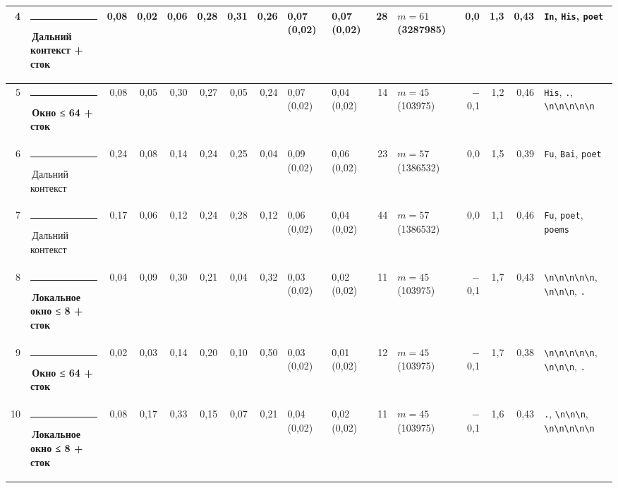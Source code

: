 \documentclass[10pt]{article}
\begin{document}
\begin{minipage}{\linewidth}
\begin{center}
{\begin{tabular}{|r|l|r|r|r|r|r|r|l|l|r|l|r|r|r|l|}
4 & \textcolor[HTML]{C3C2B7}{\rule{0.62em}{0.62em}}\,Дальний контекст + сток & 0,08 & 0,02 & 0,06 & 0,28 & 0,31 & 0,26 & 0,07 (0,02) & 0,07 (0,02) & 28 & $m{=}61$ (3287985) & 0,0 & 1,3 & 0,43 & \texttt{\textvisiblespace{}In}, \texttt{\textvisiblespace{}His}, \texttt{\textvisiblespace{}poet} \\ \hline
5 & \textcolor[HTML]{EDA100}{\rule{0.62em}{0.62em}}\,\textbf{Окно ≤ 64 + сток} & 0,08 & 0,05 & 0,30 & 0,27 & 0,05 & 0,24 & 0,07 (0,02) & 0,04 (0,02) & 14 & $m{=}45$ (103975) & $-$0,1 & 1,2 & 0,46 & \texttt{\textvisiblespace{}His}, \texttt{\textvisiblespace{}.}, \texttt{\textvisiblespace{}\textbackslash{}n\textbackslash{}n\textbackslash{}n\textbackslash{}n\textbackslash{}n} \\ \hline
6 & \textcolor[HTML]{C3C2B7}{\rule{0.62em}{0.62em}}\,Дальний контекст & 0,24 & 0,08 & 0,14 & 0,24 & 0,25 & 0,04 & 0,09 (0,02) & 0,06 (0,02) & 23 & $m{=}57$ (1386532) & 0,0 & 1,5 & 0,39 & \texttt{\textvisiblespace{}Fu}, \texttt{\textvisiblespace{}Bai}, \texttt{\textvisiblespace{}poet} \\ \hline
7 & \textcolor[HTML]{C3C2B7}{\rule{0.62em}{0.62em}}\,Дальний контекст & 0,17 & 0,06 & 0,12 & 0,24 & 0,28 & 0,12 & 0,06 (0,02) & 0,04 (0,02) & 44 & $m{=}57$ (1386532) & 0,0 & 1,1 & 0,46 & \texttt{\textvisiblespace{}Fu}, \texttt{\textvisiblespace{}poet}, \texttt{\textvisiblespace{}poems} \\ \hline
8 & \textcolor[HTML]{1BAF7A}{\rule{0.62em}{0.62em}}\,\textbf{Локальное окно ≤ 8 + сток} & 0,04 & 0,09 & 0,30 & 0,21 & 0,04 & 0,32 & 0,03 (0,02) & 0,02 (0,02) & 11 & $m{=}45$ (103975) & $-$0,1 & 1,7 & 0,43 & \texttt{\textvisiblespace{}\textbackslash{}n\textbackslash{}n\textbackslash{}n\textbackslash{}n\textbackslash{}n}, \texttt{\textvisiblespace{}\textbackslash{}n\textbackslash{}n\textbackslash{}n}, \texttt{\textvisiblespace{}.} \\ \hline
9 & \textcolor[HTML]{EDA100}{\rule{0.62em}{0.62em}}\,\textbf{Окно ≤ 64 + сток} & 0,02 & 0,03 & 0,14 & 0,20 & 0,10 & 0,50 & 0,03 (0,02) & 0,01 (0,02) & 12 & $m{=}45$ (103975) & $-$0,1 & 1,7 & 0,38 & \texttt{\textvisiblespace{}\textbackslash{}n\textbackslash{}n\textbackslash{}n\textbackslash{}n\textbackslash{}n}, \texttt{\textvisiblespace{}\textbackslash{}n\textbackslash{}n\textbackslash{}n}, \texttt{\textvisiblespace{}.} \\ \hline
10 & \textcolor[HTML]{1BAF7A}{\rule{0.62em}{0.62em}}\,\textbf{Локальное окно ≤ 8 + сток} & 0,08 & 0,17 & 0,33 & 0,15 & 0,07 & 0,21 & 0,04 (0,02) & 0,02 (0,02) & 11 & $m{=}45$ (103975) & $-$0,1 & 1,6 & 0,43 & \texttt{\textvisiblespace{}.}, \texttt{\textvisiblespace{}\textbackslash{}n\textbackslash{}n\textbackslash{}n}, \texttt{\textvisiblespace{}\textbackslash{}n\textbackslash{}n\textbackslash{}n\textbackslash{}n\textbackslash{}n} \\ \hline

\end{tabular}}
\end{center}
\end{minipage}
\end{document}
